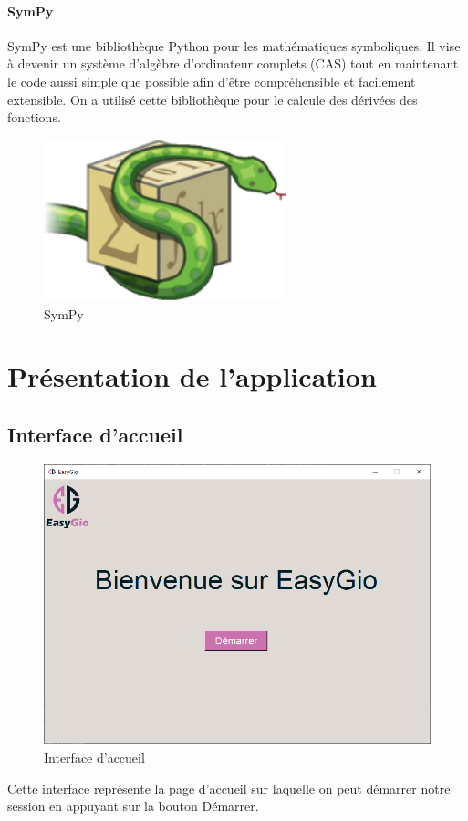 \documentclass[a4paper]{report}
\begin{document}
\subsubsection{SymPy}
SymPy est une bibliothèque Python pour les mathématiques symboliques. Il vise à devenir un système d'algèbre d'ordinateur complets (CAS) tout en maintenant le code aussi simple que possible afin d'être compréhensible et facilement extensible.
On a utilisé cette bibliothèque pour le calcule des dérivées des fonctions.
\begin{figure}[!h]
    \centering
    \includegraphics[width=7cm]{images/SymPy.png}
    \caption{SymPy}
    \label{fig:SymPy}
\end{figure}
\chapter{Présentation de l'application}
\section{Interface d'accueil}
\begin{figure}[!h]
    \centering
    \includegraphics[width=15cm]{images/Interface1.PNG}
    \caption{Interface d'accueil}
    \label{fig:Interface d'accueil}
\end{figure}
Cette interface représente la page d'accueil sur laquelle on peut démarrer notre session en appuyant sur la bouton Démarrer.
\newpage
\end{document}
